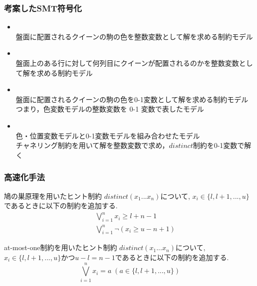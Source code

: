 \documentclass [dvipdfmx,12pt]{beamer}
\newcommand{\distinct}{$distinct$}
\begin{document}
\begin{frame}
    \frametitle{考案したSMT符号化}
    \begin{block}{}
        \begin{itemize}
            \item {}\\
                盤面に配置されるクイーンの駒の色を整数変数として解を求める制約モデル
            \item {}\\
                盤面上のある行に対して何列目にクイーンが配置されるのかを整数変数として解を求める制約モデル
            \item {}\\
                盤面に配置されるクイーンの駒の色を0-1変数として解を求める制約モデル\\
                つまり，色変数モデルの整数変数を 0-1 変数で表したモデル
            \item {}\\
                色・位置変数モデルと0-1変数モデルを組み合わせたモデル\\
                チャネリング制約を用いて解を整数変数で求め，\distinct 制約を0-1変数で解く
        \end{itemize}
    \end{block}
\end{frame}



\begin{frame}
    \frametitle{高速化手法}
    \vspace{-3mm}
    \begin{exampleblock}{鳩の巣原理を用いたヒント制約}
        $distinct(x_1 ... x_n)$について, $x_i \in \{l, l+1, ..., u\}$であるときに以下の制約を追加する.
        \vspace{-3mm}
        \begin{eqnarray}
            && \bigvee_{i=1}^n   x_i \geq l+n-1\\
            && \bigvee_{i=1}^n \lnot(x_i \geq u-n+1)
        \end{eqnarray}
    \end{exampleblock}
    \begin{exampleblock}{at-most-one制約を用いたヒント制約}
        $distinct(x_1 ... x_n)$について, $x_i \in \{l, l+1, ..., u\}$かつ$u-l=n-1$であるときに以下の制約を追加する.\\
        \vspace{-3mm}
        $$\bigvee_{i=1}^n x_i=a \; (a \in \{l, l+1, ..., u\})$$
    \end{exampleblock}
\end{frame}
\end{document}
